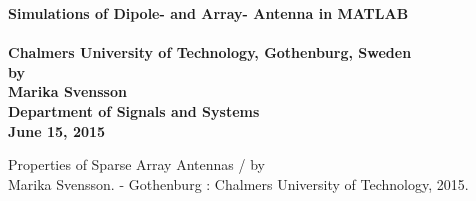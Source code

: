 \thispagestyle{empty}
$ $\\
\begin{center}
\Large \bf  Simulations of Dipole- and Array- Antenna in MATLAB\\[6.1cm]
\normalsize \rm
\\

Chalmers University of Technology, Gothenburg, Sweden \\[1cm]
by \\[1cm]
\bf Marika Svensson\\
\bf Department of Signals and Systems \\[1cm]
\normalsize \rm
June 15, 2015
\end{center}
\newpage
\thispagestyle{empty}
\noindent%
Properties of Sparse Array Antennas / by \\ Marika Svensson. - Gothenburg : Chalmers University of Technology, 2015.\\

